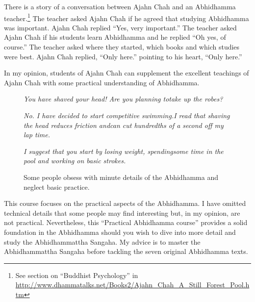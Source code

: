There is a story of a conversation between Ajahn Chah and an Abhidhamma teacher.\footnote{See section on “Buddhist Psychology” in \url{http://www.dhammatalks.net/Books2/Ajahn_Chah_A_Still_Forest_Pool.htm}} The teacher asked Ajahn Chah if he agreed that studying Abhidhamma was important. Ajahn Chah replied  “Yes, very important.” The teacher asked Ajahn Chah if his students learn Abhidhamma and he replied  “Oh yes, of course.” The teacher asked where they started, which books and which studies were best. Ajahn Chah replied, “Only here.” pointing to his heart, “Only here.”

In my opinion, students of Ajahn Chah can supplement the excellent teachings of Ajahn Chah with some practical understanding of Abhidhamma. 

\color{black}

\begin{figure}[H]
\begin{quoting}
\begin{flushleft}
\textit{You have shaved your head! Are you planning to\newline take up the robes?}
\end{flushleft}
\begin{flushright}
\textit{No. I have decided to start competitive swimming.\linebreak I read that shaving the head reduces friction and\linebreak can cut hundredths of a second off my lap time. }
\end{flushright}
\begin{flushleft}
\textit{I suggest that you start by losing weight, spending\newline some time in the pool and working on basic strokes.}
\end{flushleft}
\end{quoting}
\caption{Some people obsess with minute details of the Abhidhamma and neglect basic practice.}
\label{fig:Swimming}
\end{figure}

This course focuses on the practical aspects of the Abhidhamma. I have omitted technical details that some people may find interesting but, in my opinion, are not practical. \color{red} Nevertheless, this “Practical Abhidhamma course” provides a solid foundation in the Abhidhamma should you wish to dive into more detail and study the Abhidhammattha Sangaha. My advice is to master the Abhidhammattha Sangaha before tackling the seven original Abhidhamma texts.

